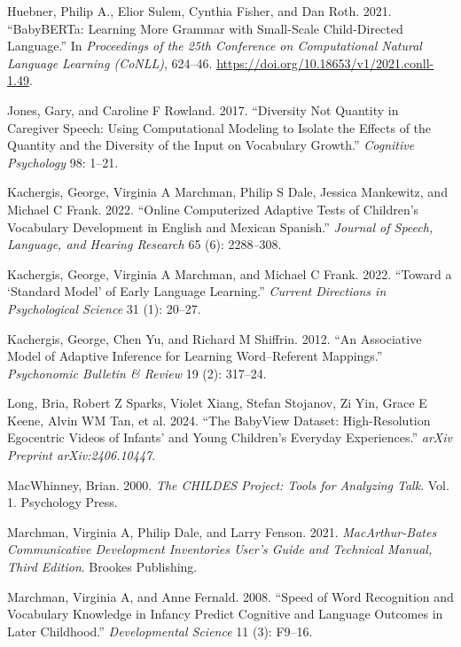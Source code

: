 \documentclass[
  11pt,
]{article}
\newlength{\cslhangindent}
\newenvironment{CSLReferences}[2] %
 {\begin{list}{}{%
  \setlength{\itemindent}{0pt}
  \setlength{\leftmargin}{0pt}
  \setlength{\parsep}{0pt}
  \ifodd #1
   \setlength{\leftmargin}{\cslhangindent}
   \setlength{\itemindent}{-1\cslhangindent}
  \fi
  \setlength{\itemsep}{#2\baselineskip}}}
 {\end{list}}
\begin{document}
\begin{CSLReferences}{1}{0}
Huebner, Philip A., Elior Sulem, Cynthia Fisher, and Dan Roth. 2021.
{``{BabyBERTa}: Learning More Grammar with Small-Scale Child-Directed
Language.''} In \emph{Proceedings of the 25th Conference on
Computational Natural Language Learning (CoNLL)}, 624--46.
\url{https://doi.org/10.18653/v1/2021.conll-1.49}.

Jones, Gary, and Caroline F Rowland. 2017. {``Diversity Not Quantity in
Caregiver Speech: Using Computational Modeling to Isolate the Effects of
the Quantity and the Diversity of the Input on Vocabulary Growth.''}
\emph{Cognitive Psychology} 98: 1--21.

Kachergis, George, Virginia A Marchman, Philip S Dale, Jessica
Mankewitz, and Michael C Frank. 2022. {``Online Computerized Adaptive
Tests of Children's Vocabulary Development in English and Mexican
Spanish.''} \emph{Journal of Speech, Language, and Hearing Research} 65
(6): 2288--308.

Kachergis, George, Virginia A Marchman, and Michael C Frank. 2022.
{``Toward a {`Standard Model'} of Early Language Learning.''}
\emph{Current Directions in Psychological Science} 31 (1): 20--27.

Kachergis, George, Chen Yu, and Richard M Shiffrin. 2012. {``An
Associative Model of Adaptive Inference for Learning Word--Referent
Mappings.''} \emph{Psychonomic Bulletin \& Review} 19 (2): 317--24.

Long, Bria, Robert Z Sparks, Violet Xiang, Stefan Stojanov, Zi Yin,
Grace E Keene, Alvin WM Tan, et al. 2024. {``The BabyView Dataset:
High-Resolution Egocentric Videos of Infants' and Young Children's
Everyday Experiences.''} \emph{arXiv Preprint arXiv:2406.10447}.

MacWhinney, Brian. 2000. \emph{The {CHILDES} Project: Tools for
Analyzing Talk}. Vol. 1. Psychology Press.

Marchman, Virginia A, Philip Dale, and Larry Fenson. 2021.
\emph{MacArthur-Bates Communicative Development Inventories User's Guide
and Technical Manual, Third Edition}. Brookes Publishing.

Marchman, Virginia A, and Anne Fernald. 2008. {``Speed of Word
Recognition and Vocabulary Knowledge in Infancy Predict Cognitive and
Language Outcomes in Later Childhood.''} \emph{Developmental Science} 11
(3): F9--16.


\end{CSLReferences}
\end{document}

